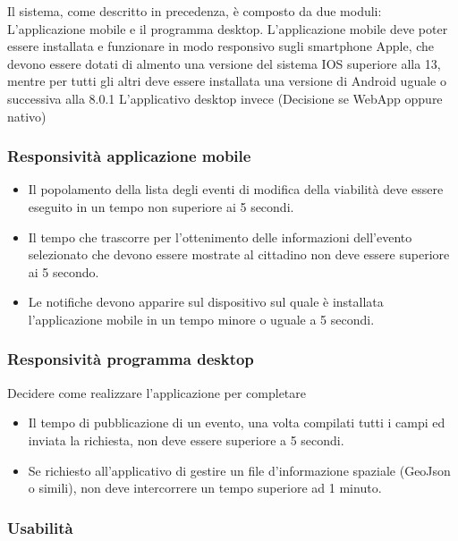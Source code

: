 \documentclass{article}
\begin{document}
Il sistema, come descritto in precedenza, è composto da due moduli: L'applicazione mobile e il programma desktop.
L'applicazione mobile deve poter essere installata e funzionare in modo responsivo sugli smartphone Apple, che devono essere dotati di almento una versione del sistema IOS superiore alla 13, mentre per tutti gli altri deve essere installata una versione di Android uguale o successiva alla 8.0.1
L'applicativo desktop invece (Decisione se WebApp oppure nativo)

\subsubsection{Responsività applicazione mobile}
\begin{itemize}
    \item Il popolamento della lista degli eventi di modifica della viabilità deve essere eseguito in un tempo non superiore ai 5 secondi.
    \item Il tempo che trascorre per l'ottenimento delle informazioni dell'evento selezionato che devono essere mostrate al cittadino non deve essere superiore ai 5 secondo.
    \item Le notifiche devono apparire sul dispositivo sul quale è installata l'applicazione mobile in un tempo minore o uguale a 5 secondi.
\end{itemize}

\subsubsection{Responsività programma desktop}
Decidere come realizzare l'applicazione per completare
\begin{itemize}
    \item Il tempo di pubblicazione di un evento, una volta compilati tutti i campi ed inviata la richiesta, non deve essere superiore a 5 secondi.
    \item Se richiesto all'applicativo di gestire un file d'informazione spaziale (GeoJson o simili), non deve intercorrere un tempo superiore ad 1 minuto.
\end{itemize}

\subsubsection{Usabilità}
\label{useCase:Usabilità}
\end{document}
